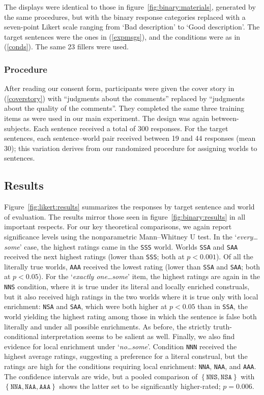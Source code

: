 \documentclass[leqno,12pt]{article}
\newcommand{\Figref}[1]{Figure~\ref{#1}}
\newcommand{\figref}[1]{figure~\ref{#1}}
\newcommand{\eg}[1]{(\ref{#1})}
\newcommand{\word}[1]{\emph{#1}}
\newcommand{\set}[1]{\ensuremath{\left\{ #1 \right\}}}
\newcommand{\world}[1]{\texttt{#1}}
\newcommand{\target}[2]{`\word{#1}\ldots\word{#2}'}
\begin{document}
{\begin{appendix}
The displays were identical to those in \figref{fig:binary:materials},
generated by the same procedures, but with the binary response
categories replaced with a seven-point Likert scale ranging from `Bad
description' to `Good description'. The target sentences were the ones
in \eg{expmsgs}, and the conditions were as in \eg{conds}. The same 23
fillers were used.

\subsubsection{Procedure} 

After reading our consent form, participants were given the cover
story in \eg{coverstory} with ``judgments about the comments''
replaced by ``judgments about the quality of the comments''.  They
completed the same three training items as were used in our main
experiment. The design was again between-subjects.  Each sentence
received a total of 300 responses. For the target sentences, each
sentence--world pair received between 19 and 44 responses (mean 30);
this variation derives from our randomized procedure for assigning
worlds to sentences.



\subsection{Results}

\Figref{fig:likert:results} summarizes the responses by target
sentence and world of evaluation. The results mirror those seen in
\figref{fig:binary:results} in all important respects.  For our key
theoretical comparisons, we again report significance levels using the
nonparametric Mann--Whitney U test. In the \target{every}{some} case,
the highest ratings came in the \world{SSS} world. Worlds \world{SSA}
and \world{SAA} received the next highest ratings (lower than
\world{SSS}; both at $p<0.001$). Of all the literally true worlds,
\world{AAA} received the lowest rating (lower than \world{SSA} and
\world{SAA}; both at $p<0.05$).  For the \target{exactly one}{some}
item, the highest ratings are again in the \world{NNS} condition,
where it is true under its literal and locally enriched construals,
but it also received high ratings in the two worlds where it is true
only with local enrichment: \world{NSA} and \world{SAA}, which were
both higher at $p<0.05$ than in \world{SSA}, the world yielding the
highest rating among those in which the sentence is false both
literally and under all possible enrichments. As before, the strictly
truth-conditional interpretation seems to be salient as well.
Finally, we also find evidence for local enrichment under
\target{no}{some}. Condition \world{NNN} received the highest average
ratings, suggesting a preference for a literal construal, but the
ratings are high for the conditions requiring local enrichment:
\world{NNA}, \world{NAA}, and \world{AAA}. The confidence intervals
are wide, but a pooled comparison of \set{\world{NNS},\world{NSA}}
with \set{\world{NNA},\world{NAA},\world{AAA}} shows the latter set to
be significantly higher-rated; $p = 0.006$.




\end{appendix}}
\end{document}
